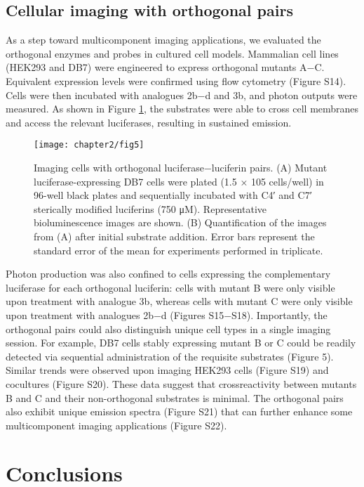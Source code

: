 \subsection*{Cellular imaging with orthogonal pairs}

As a step
toward multicomponent imaging applications, we evaluated the
orthogonal enzymes and probes in cultured cell models.
Mammalian cell lines (HEK293 and DB7) were engineered
to express orthogonal mutants A−C. Equivalent expression
levels were confirmed using flow cytometry (Figure S14). Cells
were then incubated with analogues 2b−d and 3b, and photon
outputs were measured. As shown in Figure \ref{fig:in_vitro}, the substrates
were able to cross cell membranes and access the relevant
luciferases, resulting in sustained emission.
\begin{figure}[htbp]
\texttt{[image: chapter2/fig5]}
\centering
\caption[Imaging cells with orthogonal luciferase−luciferin pairs]{Imaging cells with orthogonal luciferase−luciferin pairs. (A) Mutant luciferase-expressing DB7 cells were plated (1.5 × 105 cells/well) in
96-well black plates and sequentially incubated with C4′ and C7′ sterically modified luciferins (750 μM). Representative bioluminescence images are
shown. (B) Quantification of the images from (A) after initial substrate addition. Error bars represent the standard error of the mean for experiments
performed in triplicate.}
  \label{fig:in_vitro}
\end{figure}
Photon production
was also confined to cells expressing the complementary
luciferase for each orthogonal luciferin: cells with mutant B
were only visible upon treatment with analogue 3b, whereas
cells with mutant C were only visible upon treatment with analogues 2b−d (Figures S15−S18). Importantly, the
orthogonal pairs could also distinguish unique cell types in a
single imaging session. For example, DB7 cells stably expressing
mutant B or C could be readily detected via sequential
administration of the requisite substrates (Figure 5). Similar
trends were observed upon imaging HEK293 cells (Figure S19)
and cocultures (Figure S20). These data suggest that crossreactivity
between mutants B and C and their non-orthogonal
substrates is minimal. The orthogonal pairs also exhibit unique
emission spectra (Figure S21) that can further enhance some
multicomponent imaging applications (Figure S22).

\section{Conclusions}

